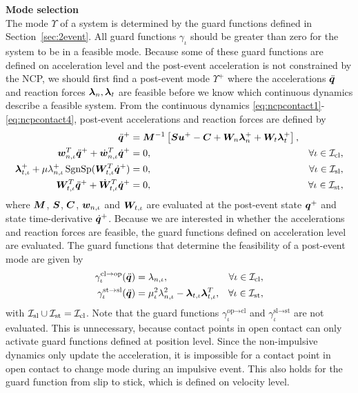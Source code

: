 \documentclass[../DC2017114Bouma.tex]{subfiles}
\begin{document}
\textbf{Mode selection}\\
The mode $\Upsilon$ of a system is determined by the guard functions defined in Section~\ref{sec:2event}. All guard functions $\gamma_\iota$ should be greater than zero for the system to be in a feasible mode. Because some of these guard functions are defined on acceleration level and the post-event acceleration is not constrained by the NCP, we should first find a post-event mode $\Upsilon^+$ where the accelerations $\ddot{{\boldsymbol{q}}}$ and reaction forces $\boldsymbol{\lambda}_{n},\boldsymbol{\lambda}_{t}$ are feasible before we know which continuous dynamics describe a feasible system. From the continuous dynamics \eqref{eq:ncpcontact1}-\eqref{eq:ncpcontact4}, post-event accelerations and reaction forces are defined by
\begin{align}
\ddot{{\boldsymbol{q}}}^+ &= {\boldsymbol{M}}^{-1}\left[{\boldsymbol{S}}{\boldsymbol{u}}^+ - {\boldsymbol{C}} + {\boldsymbol{W}}_{n}\boldsymbol{\lambda}^+_{n} + {\boldsymbol{W}}_{t}\boldsymbol{\lambda}^+_{t}\right], &  \label{eq:2nonimp1}\\
{\boldsymbol{w}}^T_{n,\iota}\ddot{{\boldsymbol{q}}}^+ + \dot{{\boldsymbol{w}}}^T_{n,\iota}\dot{{\boldsymbol{q}}}^+ &= 0, & \forall \iota\in\mathcal{I}_{\text{cl}},\label{eq:2nonimp2}\\
\boldsymbol{\lambda}^+_{t,\iota} + \mu\lambda^+_{n,\iota}\operatorname{\text{SgnSp}}({\boldsymbol{W}}_{t,\iota}^T\dot{{\boldsymbol{q}}}^+) &= 0, & \forall \iota\in\mathcal{I}_{\text{sl}},\label{eq:2nonimp3}\\
{\boldsymbol{W}}^T_{t,\iota}\ddot{{\boldsymbol{q}}}^+ + \dot{{\boldsymbol{W}}}^T_{t,\iota}\dot{{\boldsymbol{q}}}^+ &= 0, & \forall \iota\in\mathcal{I}_{\text{st}},\label{eq:2nonimp4}
\end{align}
where ${\boldsymbol{M}}$, ${\boldsymbol{S}}$, ${\boldsymbol{C}}$, ${\boldsymbol{w}}_{n,\iota}$ and ${\boldsymbol{W}}_{t,\iota}$ are evaluated at the post-event state ${\boldsymbol{q}}^+$ and state time-derivative $\dot{{\boldsymbol{q}}}^+$. Because we are interested in whether the accelerations and reaction forces are feasible, the guard functions defined on acceleration level are evaluated. The guard functions that determine the feasibility of a post-event mode are given by
\begin{align}
\gamma^{\text{cl}\rightarrow\text{op}}_{\iota}(\ddot{{\boldsymbol{q}}}) &= \lambda_{n,\iota}, & \forall \iota\in\mathcal{I}_{\text{cl}},\\
\gamma^{\text{st}\rightarrow\text{sl}}_{\iota}(\ddot{{\boldsymbol{q}}}) &= \mu_{\iota}^2\lambda_{n,\iota}^2 - \boldsymbol{\lambda}_{t,\iota}\boldsymbol{\lambda}_{t,\iota}^T, & \forall \iota\in\mathcal{I}_{\text{st}},
\end{align}
with $\mathcal{I}_{\text{sl}}\cup\mathcal{I}_{\text{st}}=\mathcal{I}_{\text{cl}}$. Note that the guard functions $\gamma_{\iota}^{\text{op}\rightarrow\text{cl}}$ and $\gamma_{\iota}^{\text{sl}\rightarrow\text{st}}$ are not evaluated. This is unnecessary, because contact points in open contact can only activate guard functions defined at position level. Since the non-impulsive dynamics only update the acceleration, it is impossible for a contact point in open contact to change mode during an impulsive event. This also holds for the guard function from slip to stick, which is defined on velocity level.
\end{document}
